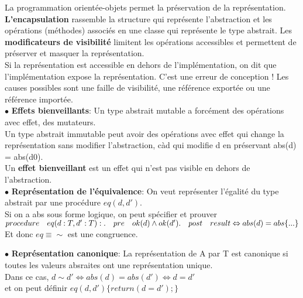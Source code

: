 La programmation orientée-objets permet la préservation de la représentation. \textbf{L'encapsulation} rassemble la structure qui représente l'abstraction et les opérations (méthodes) associés en une classe qui représente le type abstrait. Les \textbf{modificateurs de visibilité} limitent les opérations accessibles et permettent de préserver et masquer la représentation.\\
Si la représentation est accessible en dehors de l'implémentation, on dit que l'implémentation expose la représentation. C'est une erreur de conception ! Les causes possibles sont une faille de visibilité, une référence exportée ou une référence importée.\\

$\bullet$ \textbf{Effets bienveillants}: Un type abstrait mutable a forcément des opérations avec effet, des mutateurs.\\
Un type abstrait immutable peut avoir des opérations avec effet qui change la représentation sans modifier l'abstraction, càd qui modifie d en préservant abs(d) = abs(d0).\\
Un \textbf{effet bienveillant} est un effet qui n'est pas visible en dehors de l'abstraction.\\

$\bullet$ \textbf{Représentation de l'équivalence}: On veut représenter l'égalité du type abstrait par une procédure $eq(d,d')$.\\
Si on a abs sous forme logique, on peut spécifier et prouver\\
$procedure \quad eq(d:T,d':T):\\
.\quad    pre \quad ok(d) \wedge ok(d')\\
.\quad    post \quad result \Leftrightarrow abs(d) = abs\\
\{...\}$\\
Et donc $eq \equiv \sim$ est une congruence.

$\bullet$ \textbf{Représentation canonique}: La représentation de A par T est canonique si toutes les valeurs absraites ont une représentation unique.\\
Dans ce cas, $d \sim d' \Leftrightarrow abs(d) = abs(d') \Leftrightarrow d=d'$ \\et on peut définir $eq(d,d') \{return (d=d');\}$
